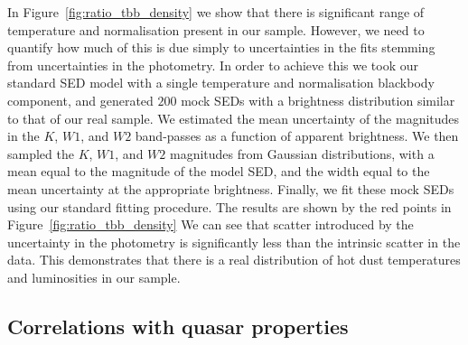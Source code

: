 In Figure~\ref{fig:ratio_tbb_density} we show that there is significant range of temperature and normalisation present in our sample. 
However, we need to quantify  how much of this is due simply to uncertainties in the fits stemming from uncertainties in the photometry. 
In order to achieve this we took our standard SED model with a single temperature and normalisation blackbody component, and generated $200$ mock SEDs with a brightness distribution similar to that of our real sample. 
We estimated the mean uncertainty of the magnitudes in the $K$, $W1$, and $W2$ band-passes as a function of apparent brightness. 
We then sampled the $K$, $W1$, and $W2$ magnitudes from Gaussian distributions, with a mean equal to the magnitude of the model SED, and the width equal to the mean uncertainty at the appropriate brightness. 
Finally, we fit these mock SEDs using our standard fitting procedure. 
The results are shown by the red points in Figure~\ref{fig:ratio_tbb_density}
We can see that scatter introduced by the uncertainty in the photometry is significantly less than the intrinsic scatter in the data. 
This demonstrates that there is a real distribution of hot dust temperatures and luminosities in our sample. 

\subsection{Correlations with quasar properties}

